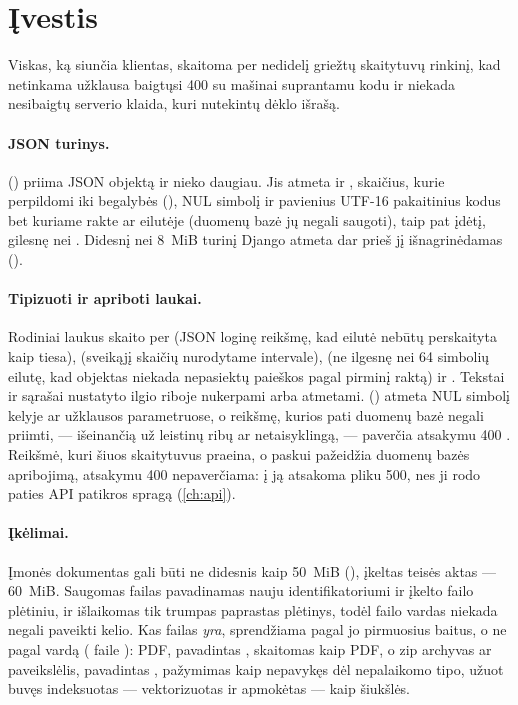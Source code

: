 \section{Įvestis}\label{sec:security:input}

Viskas, ką siunčia klientas, skaitoma per nedidelį griežtų skaitytuvų rinkinį, kad netinkama
užklausa baigtųsi 400 su mašinai suprantamu kodu ir niekada nesibaigtų serverio klaida, kuri
nutekintų dėklo išrašą.

\paragraph{JSON turinys.}  () priima JSON objektą
ir nieko daugiau. Jis atmeta  ir , skaičius, kurie perpildomi iki
begalybės (), NUL simbolį ir pavienius UTF-16 pakaitinius kodus bet kuriame rakte
ar eilutėje (duomenų bazė jų negali saugoti), taip pat įdėtį, gilesnę nei
 \code{=} . Didesnį nei 8~MiB turinį Django atmeta dar
prieš jį išnagrinėdamas ().

\paragraph{Tipizuoti ir apriboti laukai.} Rodiniai laukus skaito per  (JSON
loginę reikšmę, kad eilutė  nebūtų perskaityta kaip tiesa), 
(sveikąjį skaičių nurodytame intervale),  (ne ilgesnę nei 64 simbolių eilutę,
kad objektas niekada nepasiektų paieškos pagal pirminį raktą) ir . Tekstai ir
sąrašai nustatyto ilgio riboje nukerpami arba atmetami. 
() atmeta NUL simbolį kelyje ar užklausos parametruose, o reikšmę,
kurios pati duomenų bazė negali priimti, --- išeinančią už leistinų ribų ar netaisyklingą, ---
paverčia atsakymu 400 . Reikšmė, kuri šiuos skaitytuvus praeina, o paskui pažeidžia
duomenų bazės apribojimą, atsakymu 400 nepaverčiama: į ją atsakoma pliku 500, nes ji rodo paties
API patikros spragą (\cref{ch:api}).

\paragraph{Įkėlimai.} Įmonės dokumentas gali būti ne didesnis kaip 50~MiB
(), įkeltas teisės aktas --- 60~MiB. Saugomas failas pavadinamas nauju
identifikatoriumi ir įkelto failo plėtiniu, ir išlaikomas tik trumpas paprastas plėtinys, todėl
failo vardas niekada negali paveikti kelio. Kas failas \emph{yra}, sprendžiama pagal jo
pirmuosius baitus, o ne pagal vardą ( faile ):
PDF, pavadintas , skaitomas kaip PDF, o zip archyvas ar paveikslėlis, pavadintas
, pažymimas kaip nepavykęs dėl nepalaikomo tipo, užuot buvęs indeksuotas ---
vektorizuotas ir apmokėtas --- kaip šiukšlės.

